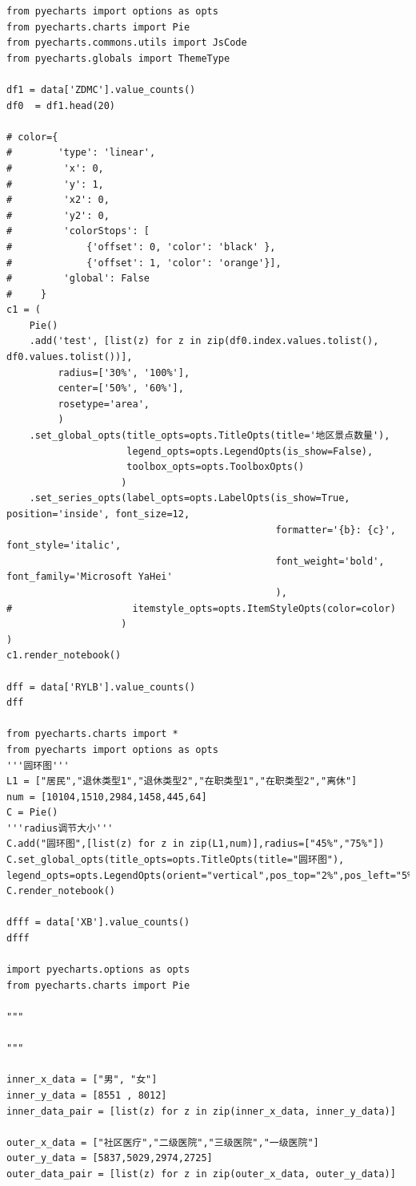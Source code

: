 \documentclass[12pt]{article}
\begin{document}
\begin{lstlisting}
from pyecharts import options as opts
from pyecharts.charts import Pie
from pyecharts.commons.utils import JsCode
from pyecharts.globals import ThemeType

df1 = data['ZDMC'].value_counts()
df0  = df1.head(20)

# color={
#        'type': 'linear',
#         'x': 0,
#         'y': 1,
#         'x2': 0,
#         'y2': 0,
#         'colorStops': [
#             {'offset': 0, 'color': 'black' },
#             {'offset': 1, 'color': 'orange'}],
#         'global': False
#     }
c1 = (
    Pie()
    .add('test', [list(z) for z in zip(df0.index.values.tolist(), df0.values.tolist())],
         radius=['30%', '100%'],
         center=['50%', '60%'],
         rosetype='area',
         )
    .set_global_opts(title_opts=opts.TitleOpts(title='地区景点数量'),
                     legend_opts=opts.LegendOpts(is_show=False),
                     toolbox_opts=opts.ToolboxOpts()
                    )
    .set_series_opts(label_opts=opts.LabelOpts(is_show=True, position='inside', font_size=12,
                                               formatter='{b}: {c}', font_style='italic',
                                               font_weight='bold', font_family='Microsoft YaHei'
                                               ),
#                     itemstyle_opts=opts.ItemStyleOpts(color=color)
                    )
)
c1.render_notebook()

dff = data['RYLB'].value_counts()
dff

from pyecharts.charts import *
from pyecharts import options as opts
'''圆环图'''
L1 = ["居民","退休类型1","退休类型2","在职类型1","在职类型2","离休"]
num = [10104,1510,2984,1458,445,64]
C = Pie()
'''radius调节大小'''
C.add("圆环图",[list(z) for z in zip(L1,num)],radius=["45%","75%"])
C.set_global_opts(title_opts=opts.TitleOpts(title="圆环图"),
legend_opts=opts.LegendOpts(orient="vertical",pos_top="2%",pos_left="5%"))
C.render_notebook()

dfff = data['XB'].value_counts()
dfff

import pyecharts.options as opts
from pyecharts.charts import Pie

"""

"""

inner_x_data = ["男", "女"]
inner_y_data = [8551 , 8012]
inner_data_pair = [list(z) for z in zip(inner_x_data, inner_y_data)]

outer_x_data = ["社区医疗","二级医院","三级医院","一级医院"]
outer_y_data = [5837,5029,2974,2725]
outer_data_pair = [list(z) for z in zip(outer_x_data, outer_y_data)]


\end{lstlisting}
\end{document}
